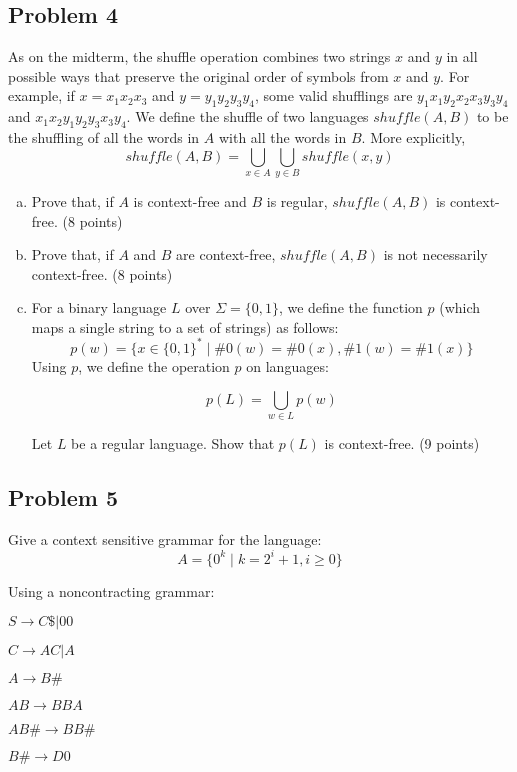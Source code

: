 \documentclass{article}
\begin{document}
            \subsection*{Problem 4}
            As on the midterm, the shuffle operation combines two strings $x$ and $y$ in all possible
            ways that preserve the original order of symbols from $x$ and $y$.  For example, if
            $x=x_1x_2x_3$ and $y=y_1y_2y_3y_4$, some valid shufflings are $y_1x_1y_2x_2x_3y_3y_4$ and
            $x_1x_2y_1y_2y_3x_3y_4$.  We define the shuffle of two languages $shuffle(A,B)$ to be the
            shuffling of all the words in $A$ with all the words in $B$.  More explicitly,
            \[shuffle(A,B)=\bigcup\limits_{x \in A}\bigcup\limits_{y \in B} shuffle(x,y)\]
            \begin{enumerate}[(a)]
    \item Prove that, if $A$ is context-free and $B$ is regular, $shuffle(A,B)$ is
context-free. (8 points)
    \item Prove that, if $A$ and $B$ are context-free, $shuffle(A,B)$ is not necessarily
context-free. (8 points)
    \item For a binary language $L$ over $\Sigma=\{0,1\}$, we define the function $p$ (which
            maps a single string to a set of strings) as follows:
    \[p(w) = \{ x \in \{0,1\}^* \;|\; \#0(w) = \#0(x), \#1(w) = \#1(x) \}\]
    Using $p$, we define the operation $p$ on languages:

    \[p(L) = \bigcup\limits_{w \in L} p(w)\]

Let $L$ be a regular language.  Show that $p(L)$ is context-free. (9 points)
    \end{enumerate}
    \newpage
    \subsection*{Problem 5}

    Give a context sensitive grammar for the language:
    \[A = \{0^k \;|\; k = 2^i+1,i\ge0\}\]

Using a noncontracting grammar:

    $S \rightarrow C\$ | 00$

    $C \rightarrow AC | A$

    $A \rightarrow B\#$

    $AB \rightarrow BBA$

    $AB\# \rightarrow BB\#$

    $B\# \rightarrow D0$
\end{document}
